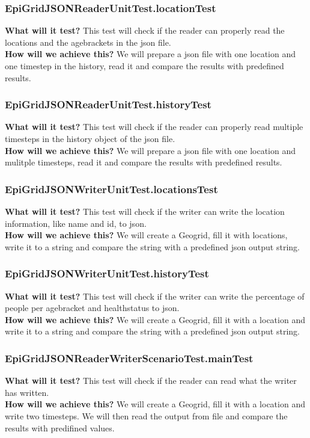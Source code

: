 \documentclass{article}
\begin{document}
\subsubsection{EpiGridJSONReaderUnitTest.locationTest}
\textbf{What will it test?} 
This test will check if the reader can properly read the locations and the agebrackets in the json file. \\
\newline
\textbf{How will we achieve this?} 
We will prepare a json file with one location and one timestep in the history, read it and compare the results with predefined results.
\subsubsection{EpiGridJSONReaderUnitTest.historyTest}
\textbf{What will it test?} 
This test will check if the reader can properly read multiple timesteps in the history object of the json file. \\
\newline
\textbf{How will we achieve this?} 
We will prepare a json file with one location and mulitple timesteps, read it and compare the results with predefined results.
\subsubsection{EpiGridJSONWriterUnitTest.locationsTest}
\textbf{What will it test?} 
This test will check if the writer can write the location information, like name and id, to json.\\
\newline
\textbf{How will we achieve this?} 
We will create a Geogrid, fill it with locations, write it to a string and compare the string with a predefined json output string.
\subsubsection{EpiGridJSONWriterUnitTest.historyTest}
\textbf{What will it test?} 
This test will check if the writer can write the percentage of people per agebracket and healthstatus to json.\\
\newline
\textbf{How will we achieve this?} 
We will create a Geogrid, fill it with a location and write it to a string and compare the string with a predefined json output string.
\subsubsection{EpiGridJSONReaderWriterScenarioTest.mainTest}
\textbf{What will it test?} 
This test will check if the reader can read what the writer has written.\\
\newline
\textbf{How will we achieve this?} 
We will create a Geogrid, fill it with a location and write two timesteps. We will then read the output from file and compare the results with predifined values.
\end{document}
